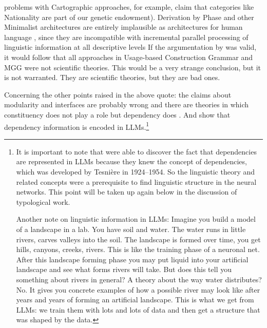 problems with Cartographic approaches, for example,  claim that
categories like Nationality are part of our genetic endowment). Derivation by Phase \citep{Chomsky2008a} and other Minimalist architectures \citep[812, 830]{Richards2015a} are
entirely implausible as architectures for human language \citep[Section~3.6]{BM2021a}, since they
are incompatible with incremental parallel processing of linguistic information at all descriptive
levels 
\iftoggle{long}{\citep{Marslen-Wilson75a,TSKES96a,Labelle2007a}.}{%
\citep{Marslen-Wilson75a,TSKES96a}.}
If the argumentation by
 was valid, it would follow that all approaches in 
Usage-based Construction Grammar and MGG were not scientific theories. This would be a very strange
conclusion, but it is not warranted. They are scientific theories, but they are bad ones.

Concerning the other points raised in the above quote: the claims about modularity and interfaces are probably
wrong \parencites{Pulvermueller1999a-u,PCS2013a-u}[, 27]{Jackendoff2000a}{Kuhn2007a} and there are theories in which constituency does not play
a role but dependency does \citep{Tesniere59a-Eng}. And \citet{ClarkKhandelwalLevaManning2019a,HewittManning2019a,ManningClarkHewitt2020a} show that
dependency information is encoded in LLMs.\footnote{\label{fn-dependencies}%
  It is important to note that \citet{ClarkKhandelwalLevaManning2019a,HewittManning2019a,ManningClarkHewitt2020a} were able to discover the fact that
  dependencies are represented in LLMs because they knew the concept of dependencies, which was
  developed by Tesnière in 1924--1954. So the linguistic theory and related concepts were a prerequisite
  to find linguistic structure in the neural networks. This point will be taken up again
  below in the discussion of typological work.

  Another note on linguistic information in LLMs: Imagine you build a model of a landscape in a
  lab. You have soil and water. The water runs in little rivers, carves valleys into the soil. The
  landscape is formed over time, you get hills, canyons, creeks, rivers. This is like the training
  phase of a neuronal net. After this landscape forming phase you may put liquid into your artificial
  landscape and see what forms rivers will take. But does this tell you something about rivers in
  general? A theory about the way water distributes? No. It gives you concrete examples of how a possible
  river may look like after years and years of forming an artificial landscape. This is what we get
  from LLMs: we train them with lots and lots of data and then get a structure that was shaped by
  the data.
}

